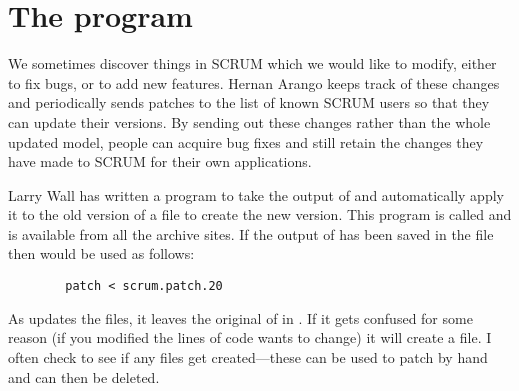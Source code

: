 \section{The  program}
\label{Patch}
We sometimes discover things in SCRUM which we would like to modify,
either to fix bugs, or to add new features.
Hernan Arango keeps track of these changes
and periodically sends patches to the
list of known SCRUM users so that they can update their versions.  By
sending out these changes rather than the whole updated model, people
can acquire bug fixes and still retain the changes they have made to
SCRUM for their own applications.

Larry Wall has written a program to take the output of  and
automatically apply it to the old version of a file to create the new
version.  This program is called  and is available from all
the  archive sites.  If the output of  has been
saved in the file  then  would be used
as follows:
\begin{verbatim}
        patch < scrum.patch.20
\end{verbatim}
As  updates the files, it leaves the original of
 in .  If it gets confused for some reason
(if you modified the lines of code  wants to change)
it will create a  file.  I
often check to see if any  files get created---these can be
used to patch  by hand and can then be deleted.

